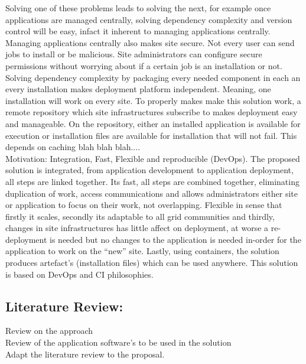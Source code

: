 \documentclass [titlepage,11pt]{article}
\begin{document}
Solving one of these problems leads to solving the next, for example once applications are managed centrally, solving dependency complexity and version control will be easy, infact it inherent to managing applications centrally. Managing applications centrally also makes site secure. Not every user can send jobs to install or be malicious. Site administrators can configure secure permissions without worrying about if a certain job is an installation or not. Solving dependency complexity by packaging every needed component in each an every installation makes deployment platform independent. Meaning, one installation will work on every site. To properly makes make this solution work, a remote repository which site infrastructures subscribe to makes deployment easy and manageable. On the repository, either an installed application is available for execution or installation files are available for installation that will not fail. This depends on caching blah blah blah....  \\

Motivation: Integration, Fast, Flexible and reproducible (DevOps). 
The proposed solution is integrated, from application development to application deployment, all steps are linked together. Its fast, all steps are combined together, eliminating duplication of work, access communications and allows administrators either site or application to focus on their work, not overlapping. Flexible in sense that firstly it scales, secondly its adaptable to all grid communities and thirdly, changes in site infrastructures has little affect on deployment, at worse a re-deployment is needed but no changes to the application is needed in-order for the application to work on the ``new'' site.  Lastly, using containers, the solution produces artefact's (installation files) which can be used anywhere. This solution is based on DevOps and CI philosophies. \\

\subsection{Literature Review: }
Review on the approach \\
Review of the application software's to be used in the solution \\
Adapt the literature review to the proposal. \\
\end{document}
